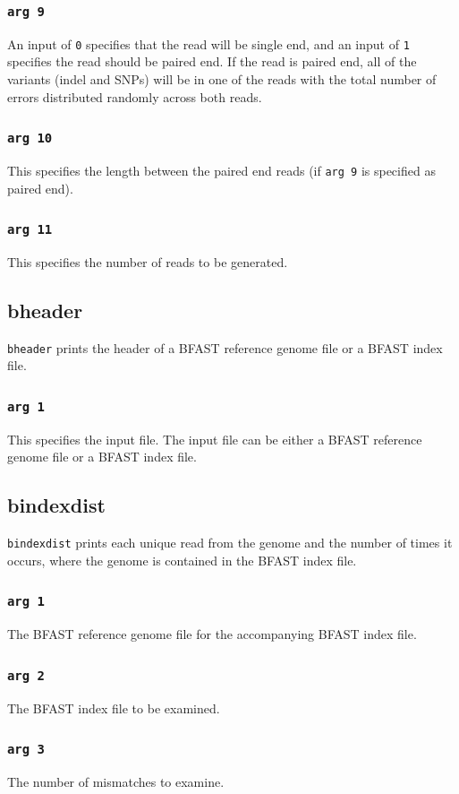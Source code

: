 \documentclass[a4paper,12pt]{book}
\newcommand{\TT}[1]{{\tt #1}} %
\newcommand{\BRGF}{BFAST reference genome file} %
\newcommand{\BIF}{BFAST index file} %
\begin{document}
\subsubsection{\TT{arg 9}}
An input of \TT{0} specifies that the read will be single end, and an input of \TT{1} specifies the read should be paired end.
If the read is paired end, all of the variants (indel and SNPs) will be in one of the reads with the total number of errors distributed randomly across both reads.
\subsubsection{\TT{arg 10}}
This specifies the length between the paired end reads (if \TT{arg 9} is specified as paired end).
\subsubsection{\TT{arg 11}}
This specifies the number of reads to be generated.

\subsection{bheader}
\label{sec:bheader}
\TT{bheader} prints the header of a \BRGF{} or a \BIF{}.
\subsubsection{\TT{arg 1}}
This specifies the input file.  
The input file can be either a \BRGF{} or a \BIF{}.

\subsection{bindexdist}
\label{sec:bindexdist}
\TT{bindexdist} prints each unique read from the genome and the number of times it occurs, where the genome is contained in the \BIF{}.
\subsubsection{\TT{arg 1}}
The \BRGF{} for the accompanying \BIF{}.
\subsubsection{\TT{arg 2}}
The \BIF{} to be examined.
\subsubsection{\TT{arg 3}}
The number of mismatches to examine.
\end{document}
